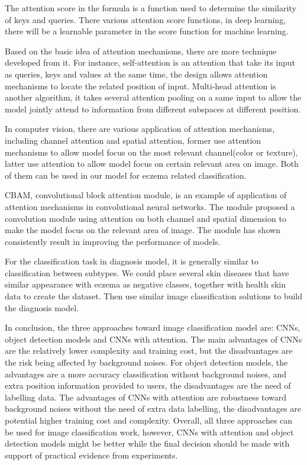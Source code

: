                     The attention score in the formula is a function used to determine the similarity of keys and queries. There various attention score functions, in deep learning, there will be a learnable parameter in the score function for machine learning.

                    Based on the basic idea of attention mechanisms, there are more technique developed from it. For instance, self-attention\cite{cheng2016long} is an attention that take its input as queries, keys and values at the same time, the design allows attention mechanisms to locate the related position of input. Multi-head attention is another algorithm, it takes several attention pooling on a same input to allow the model jointly attend to information from different subspaces at different position\cite{vaswani2017attention}.

                    In computer vision, there are various application of attention mechanisms, including channel attention and spatial attention, former use attention mechanisms to allow model focus on the most relevant channel(color or texture), latter use attention to allow model focus on certain relevant area on image. Both of them can be used in our model for eczema related classification. 

                    CBAM, convolutional block attention module, is an example of application of attention mechanisms in convolutional neural networks\cite{woo2018cbam}. The module proposed a convolution module using attention on both channel and spatial dimension to make the model focus on the relevant area of image. The module has shown consistently result in improving the performance of models.

                    For the classification task in diagnosis model, it is generally similar to classification between subtypes. We could place several skin diseases that have similar appearance with eczema as negative classes, together with health skin data to create the dataset. Then use similar image classification solutions to build the diagnosis model.

                    In conclusion, the three approaches toward image classification model are: CNNs, object detection models and CNNs with attention. The main advantages of CNNs are the relatively lower complexity and training cost, but the disadvantages are the risk being affected by background noises. For object detection models, the advantages are a more accuracy classification without background noises, and extra position information provided to users, the disadvantages are the need of labelling data. The advantages of CNNs with attention are robustness toward background noises without the need of extra data labelling, the disadvantages are potential higher training cost and complexity. Overall, all three approaches can be used for image classification work, however, CNNs with attention and object detection models might be better while the final decision should be made with support of practical evidence from experiments.
